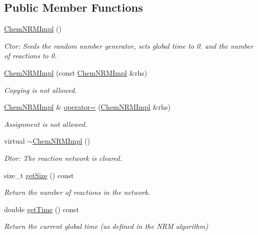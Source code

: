 \subsection*{Public Member Functions}
\begin{DoxyCompactItemize}
\item 
\hyperlink{classchem_1_1ChemNRMImpl_ac1d00b6e06300f4959eb7e850a472ab3}{Chem\-N\-R\-M\-Impl} ()
\begin{DoxyCompactList}\small\item\em Ctor\-: Seeds the random number generator, sets global time to 0. and the number of reactions to 0. \end{DoxyCompactList}\item 
\hyperlink{classchem_1_1ChemNRMImpl_a47d840cba59a2539e65b002a6734f785}{Chem\-N\-R\-M\-Impl} (const \hyperlink{classchem_1_1ChemNRMImpl}{Chem\-N\-R\-M\-Impl} \&rhs)
\begin{DoxyCompactList}\small\item\em Copying is not allowed. \end{DoxyCompactList}\item 
\hyperlink{classchem_1_1ChemNRMImpl}{Chem\-N\-R\-M\-Impl} \& \hyperlink{classchem_1_1ChemNRMImpl_ab9a899fd0d206d67fa30f1aeac103eae}{operator=} (\hyperlink{classchem_1_1ChemNRMImpl}{Chem\-N\-R\-M\-Impl} \&rhs)
\begin{DoxyCompactList}\small\item\em Assignment is not allowed. \end{DoxyCompactList}\item 
virtual \hyperlink{classchem_1_1ChemNRMImpl_a7ce15fefe312380122c36b0860e3014a}{$\sim$\-Chem\-N\-R\-M\-Impl} ()
\begin{DoxyCompactList}\small\item\em Dtor\-: The reaction network is cleared. \end{DoxyCompactList}\item 
size\-\_\-t \hyperlink{classchem_1_1ChemNRMImpl_a0be634b1313bcce9adc160614f34821c}{get\-Size} () const 
\begin{DoxyCompactList}\small\item\em Return the number of reactions in the network. \end{DoxyCompactList}\item 
double \hyperlink{classchem_1_1ChemNRMImpl_accb564d1778f3025c9e9a5a02e7987ec}{get\-Time} () const 
\begin{DoxyCompactList}\small\item\em Return the current global time (as defined in the N\-R\-M algorithm) \end{DoxyCompactList}\item 

\end{DoxyCompactItemize}
